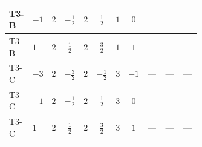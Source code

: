 \documentclass[8pt]{article}
\begin{document}
\begin{landscape}
\begin{longtable}{@{}llcccccc >{\raggedright\arraybackslash}p{0.21\linewidth} >{\raggedright\arraybackslash}p{0.21\linewidth} >{\raggedright\arraybackslash}p{0.21\linewidth}@{}}
T3-B & $-1$ & $2$ & $-\frac{1}{2}$ & $2$ & $\frac{1}{2}$ & $1$ & $0$ & \scriptsize\adjustbox{max width=\linewidth}{$\begin{gathered} +{\lambda_{H H^\dagger S_1^\dagger S_2^\dagger}^{\rm Cross}} \left(\frac{1}{2} \operatorname{Tr}\!\left({y_1}\,\left({y_2}\right)^{\dagger}\right)+4 \left({\lambda_{H H^\dagger S_1^\dagger S_2^\dagger}^{\rm Cross}}\right)^{*}+3 \left({\lambda_{10}}\right)^{*}\right)\end{gathered}$} & \scriptsize\adjustbox{max width=\linewidth}{$\begin{gathered} +\frac{1}{2} \left({\lambda_{H H^\dagger S_1^\dagger S_2^\dagger}^{\rm Cross}}\right)^{*} \operatorname{Tr}\!\left({y_2}\,\left({y_1}\right)^{\dagger}\right)\end{gathered}$} & \scriptsize\adjustbox{max width=\linewidth}{$\begin{gathered} +3 {\lambda_{10}} \left({\lambda_{H H^\dagger S_1^\dagger S_2^\dagger}^{\rm Cross}}\right)^{*}\end{gathered}$} \\
\midrule
T3-B & $1$ & $2$ & $\frac{1}{2}$ & $2$ & $\frac{3}{2}$ & $1$ & $1$ & --- & --- & --- \\
\midrule
T3-C & $-3$ & $2$ & $-\frac{3}{2}$ & $2$ & $-\frac{1}{2}$ & $3$ & $-1$ & --- & --- & --- \\
\midrule
T3-C & $-1$ & $2$ & $-\frac{1}{2}$ & $2$ & $\frac{1}{2}$ & $3$ & $0$ & \scriptsize\adjustbox{max width=\linewidth}{$\begin{gathered} +{\lambda_{H H^\dagger S_1^\dagger S_2^\dagger}^{\rm Cross}} \left(\frac{3}{4} \operatorname{Tr}\!\left({y_1}\,\left({y_2}\right)^{\dagger}\right)+4 \left({\lambda_{H H^\dagger S_1^\dagger S_2^\dagger}^{\rm Cross}}\right)^{*}+3 \left({\lambda_{10}}\right)^{*}\right)\end{gathered}$} & \scriptsize\adjustbox{max width=\linewidth}{$\begin{gathered} +\frac{3}{4} \left({\lambda_{H H^\dagger S_1^\dagger S_2^\dagger}^{\rm Cross}}\right)^{*} \operatorname{Tr}\!\left({y_2}\,\left({y_1}\right)^{\dagger}\right)\end{gathered}$} & \scriptsize\adjustbox{max width=\linewidth}{$\begin{gathered} +3 {\lambda_{10}} \left({\lambda_{H H^\dagger S_1^\dagger S_2^\dagger}^{\rm Cross}}\right)^{*}\end{gathered}$} \\
\midrule
T3-C & $1$ & $2$ & $\frac{1}{2}$ & $2$ & $\frac{3}{2}$ & $3$ & $1$ & --- & --- & --- \\

\end{longtable}
\end{landscape}
\end{document}
